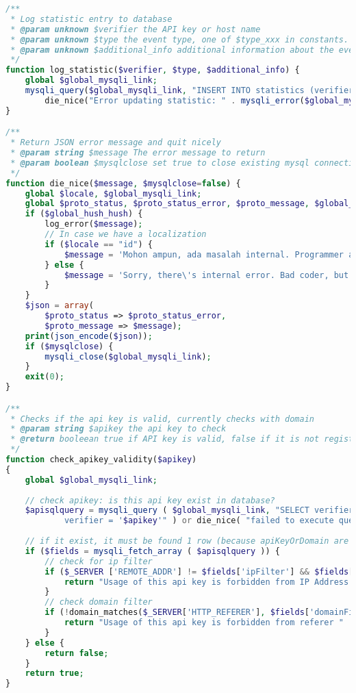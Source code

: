\begin{lstlisting}[language=PHP,basicstyle=\tiny,caption=utils.php,label={lst:utils.php}]
/**
 * Log statistic entry to database
 * @param unknown $verifier the API key or host name
 * @param unknown $type the event type, one of $type_xxx in constants.
 * @param unknown $additional_info additional information about the event
 */
function log_statistic($verifier, $type, $additional_info) {
	global $global_mysqli_link;
	mysqli_query($global_mysqli_link, "INSERT INTO statistics (verifier, type, additionalInfo) VALUES ('$verifier','$type','$additional_info')") or
		die_nice("Error updating statistic: " . mysqli_error($global_mysqli_link));
}

/**
 * Return JSON error message and quit nicely
 * @param string $message The error message to return
 * @param boolean $mysqlclose set true to close existing mysql connection
 */
function die_nice($message, $mysqlclose=false) {
	global $locale, $global_mysqli_link;
	global $proto_status, $proto_status_error, $proto_message, $global_hush_hush;
	if ($global_hush_hush) {
		log_error($message);
		// In case we have a localization
		if ($locale == "id") {
			$message = 'Mohon ampun, ada masalah internal. Programmer amatir! Tapi jangan khawatir, ia akan ditegur.';
		} else {
			$message = 'Sorry, there\'s internal error. Bad coder, but he\'ll be notified!';
		}
	}
	$json = array(
		$proto_status => $proto_status_error,
		$proto_message => $message);
	print(json_encode($json));
	if ($mysqlclose) {
		mysqli_close($global_mysqli_link);
	}
	exit(0);
}

/**
 * Checks if the api key is valid, currently checks with domain
 * @param string $apikey the api key to check
 * @return booleean true if API key is valid, false if it is not registered, or a string containing other error messages  
 */
function check_apikey_validity($apikey)
{
	global $global_mysqli_link;
	
	// check apikey: is this api key exist in database?
	$apisqlquery = mysqli_query ( $global_mysqli_link, "SELECT verifier, ipFilter, domainFilter FROM apikeys WHERE
			verifier = '$apikey'" ) or die_nice( "failed to execute query on Apikey check." );
	
	// if it exist, it must be found 1 row (because apiKeyOrDomain are unique)
	if ($fields = mysqli_fetch_array ( $apisqlquery )) {
		// check for ip filter
		if ($_SERVER ['REMOTE_ADDR'] != $fields['ipFilter'] && $fields['ipFilter'] != NULL) {
			return "Usage of this api key is forbidden from IP Address " . $_SERVER ['REMOTE_ADDR'];
		}
		// check domain filter
		if (!domain_matches($_SERVER['HTTP_REFERER'], $fields['domainFilter'])) {
			return "Usage of this api key is forbidden from referer " . $_SERVER['HTTP_REFERER'];
		}
	} else {
		return false;
	}
	return true;
}


\end{lstlisting}
